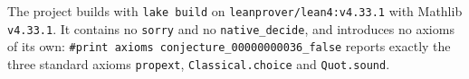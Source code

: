 \documentclass[11pt]{article}
\theoremstyle{plain}
\theoremstyle{definition}
\theoremstyle{remark}
\begin{document}
The project builds with \texttt{lake build} on
\texttt{leanprover/lean4:v4.33.1} with Mathlib \texttt{v4.33.1}. It contains
no \texttt{sorry} and no \texttt{native\_decide}, and introduces no axioms of
its own: \texttt{\#print axioms conjecture\_00000000036\_false} reports exactly
the three standard axioms \texttt{propext}, \texttt{Classical.choice} and
\texttt{Quot.sound}.
\end{document}
